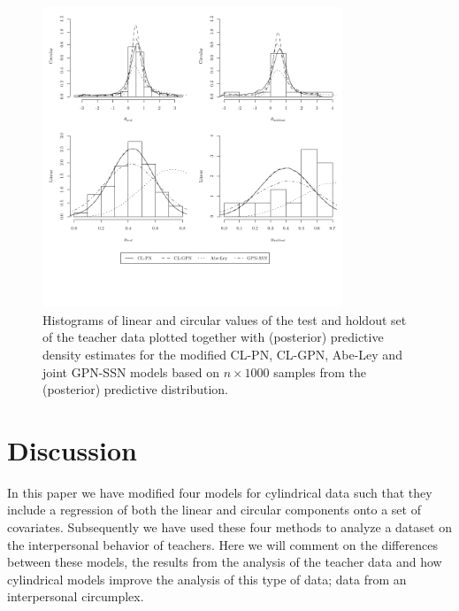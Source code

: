 \documentclass[11pt,]{article}
\begin{document}
\begin{figure}
\centering
\includegraphics[width = 0.8\textwidth]{Plots/preddistdiffSE.pdf}
\caption{Histograms of linear and circular values of the test and holdout set of the teacher data plotted together with (posterior) predictive density estimates for the modified CL-PN, CL-GPN, Abe-Ley and joint GPN-SSN models based on $n \times 1000$ samples from the (posterior) predictive distribution.}
\label{preddist}
\end{figure}

\section{Discussion}\label{Discussion}

In this paper we have modified four models for cylindrical data such
that they include a regression of both the linear and circular
components onto a set of covariates. Subsequently we have used these
four methods to analyze a dataset on the interpersonal behavior of
teachers. Here we will comment on the differences between these models,
the results from the analysis of the teacher data and how cylindrical
models improve the analysis of this type of data; data from an
interpersonal circumplex.
\end{document}

